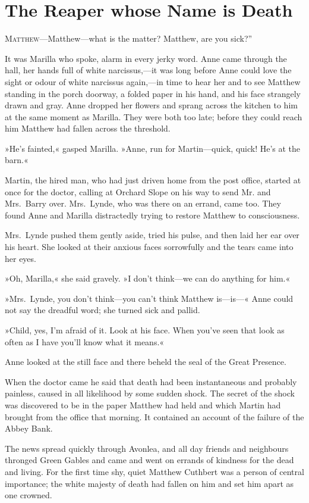 \chapter{The Reaper whose Name is Death}

\lettrine[ante=“,lines=4]{M}{atthew}—Matthew—what is the matter? Matthew, are you sick?”

\zz
It was Marilla who spoke, alarm in every jerky word. Anne came through the hall, her hands full of white narcissus,—it was long before Anne could love the sight or odour of white narcissus again,—in time to hear her and to see Matthew standing in the porch doorway, a folded paper in his hand, and his face strangely drawn and gray. Anne dropped her flowers and sprang across the kitchen to him at the same moment as Marilla. They were both too late; before they could reach him Matthew had fallen across the threshold.

»He's fainted,« gasped Marilla. »Anne, run for Martin—quick, quick! He's at the barn.«

Martin, the hired man, who had just driven home from the post office, started at once for the doctor, calling at Orchard Slope on his way to send Mr. and Mrs.~Barry over. Mrs.~Lynde, who was there on an errand, came too. They found Anne and Marilla distractedly trying to restore Matthew to consciousness.

Mrs.~Lynde pushed them gently aside, tried his pulse, and then laid her ear over his heart. She looked at their anxious faces sorrowfully and the tears came into her eyes.

»Oh, Marilla,« she said gravely. »I don't think—we can do anything for him.«

»Mrs.~Lynde, you don't think—you can't think Matthew is—is—« Anne could not say the dreadful word; she turned sick and pallid.

»Child, yes, I'm afraid of it. Look at his face. When you've seen that look as often as I have you'll know what it means.«

Anne looked at the still face and there beheld the seal of the Great Presence.

When the doctor came he said that death had been instantaneous and probably painless, caused in all likelihood by some sudden shock. The secret of the shock was discovered to be in the paper Matthew had held and which Martin had brought from the office that morning. It contained an account of the failure of the Abbey Bank.

The news spread quickly through Avonlea, and all day friends and neighbours thronged Green Gables and came and went on errands of kindness for the dead and living. For the first time shy, quiet Matthew Cuthbert was a person of central importance; the white majesty of death had fallen on him and set him apart as one crowned.

